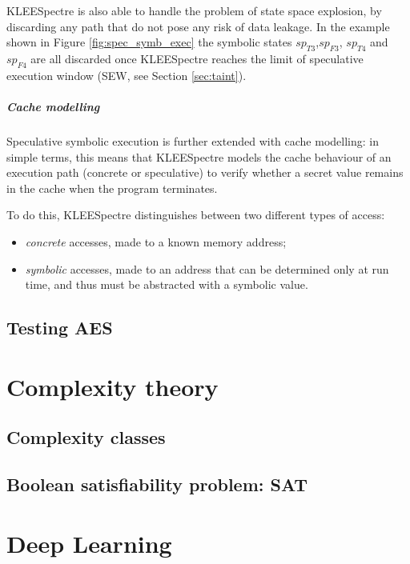 \documentclass[12pt,a4paper]{book}
\theoremstyle{definition}
\begin{document}
	KLEESpectre is also able to handle the problem of state space explosion, by discarding any path that do not pose any risk of data leakage. In the example shown in Figure \ref{fig:spec_symb_exec} the symbolic states $sp_{T3}$,$sp_{F3}$, $sp_{T4}$ and $sp_{F4}$ are all discarded once KLEESpectre reaches the limit of speculative execution window (SEW, see Section \ref{sec:taint}). 
	\paragraph{Cache modelling} Speculative symbolic execution is further extended with cache modelling: in simple terms, this means that KLEESpectre models the cache behaviour of an execution path (concrete or speculative) to verify whether a secret value remains in the cache when the program terminates. 
	
	To do this, KLEESpectre distinguishes between two different types of access:
	\begin{itemize}
		\item \textit{concrete} accesses, made to a known memory address;
		\item \textit{symbolic} accesses, made to an address that can be determined only at run time, and thus must be abstracted with a symbolic value. 
	\end{itemize}
	
	\section{Testing AES}\label{sec:testing}
	\appendix
	\chapter{Complexity theory}\label{appendix:complexity}
	\section{Complexity classes}
	\section{Boolean satisfiability problem: SAT}
	\chapter{Deep Learning}\label{appendix:dl}
\end{document}
